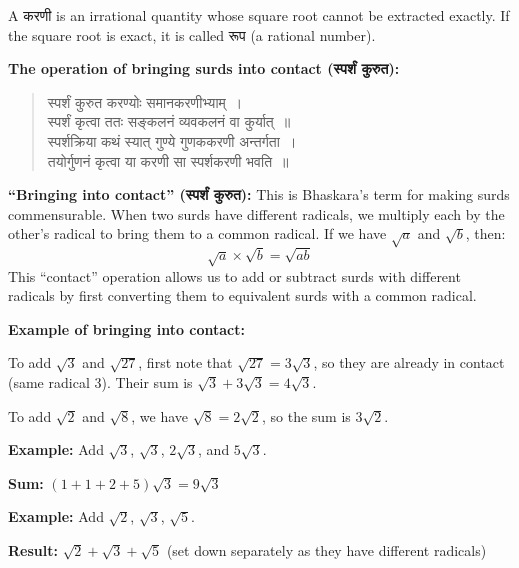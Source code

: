 \documentclass[11pt,a4paper]{article}
\newcommand{\dev}[1]{{\devanagarifont #1}}
\begin{document}
\vspace{0.3cm}

A \dev{करणी} is an irrational quantity whose square root cannot be extracted exactly. If the square root is exact, it is called \dev{रूप} (a rational number).

\vspace{0.5cm}

\textbf{The operation of bringing surds into contact (\dev{स्पर्शं कुरुत}):}

\begin{verse}
\devanagarifont
\centering
\color{versecolor}
\dev{स्पर्शं कुरुत करण्योः समानकरणीभ्याम्~।}\\
\dev{स्पर्शं कृत्वा ततः सङ्कलनं व्यवकलनं वा कुर्यात्~॥}\\[0.3cm]
\dev{स्पर्शक्रिया कथं स्यात् गुण्ये गुणककरणी अन्तर्गता~।}\\
\dev{तयोर्गुणनं कृत्वा या करणी सा स्पर्शकरणी भवति~॥}
\end{verse}

\vspace{0.3cm}

\textbf{``Bringing into contact'' (\dev{स्पर्शं कुरुत}):} This is Bhaskara's term for making surds commensurable. When two surds have different radicals, we multiply each by the other's radical to bring them to a common radical. If we have $\sqrt{a}$ and $\sqrt{b}$, then:
\[
\sqrt{a} \times \sqrt{b} = \sqrt{ab}
\]
This ``contact'' operation allows us to add or subtract surds with different radicals by first converting them to equivalent surds with a common radical.

\vspace{0.3cm}

\textbf{Example of bringing into contact:}

To add $\sqrt{3}$ and $\sqrt{27}$, first note that $\sqrt{27} = 3\sqrt{3}$, so they are already in contact (same radical 3). Their sum is $\sqrt{3} + 3\sqrt{3} = 4\sqrt{3}$.

To add $\sqrt{2}$ and $\sqrt{8}$, we have $\sqrt{8} = 2\sqrt{2}$, so the sum is $3\sqrt{2}$.

\vspace{0.3cm}

\textbf{Example:} Add $\sqrt{3}$, $\sqrt{3}$, $2\sqrt{3}$, and $5\sqrt{3}$.

\textbf{Sum:} $(1 + 1 + 2 + 5)\sqrt{3} = 9\sqrt{3}$

\textbf{Example:} Add $\sqrt{2}$, $\sqrt{3}$, $\sqrt{5}$.

\textbf{Result:} $\sqrt{2} + \sqrt{3} + \sqrt{5}$ (set down separately as they have different radicals)
\end{document}
